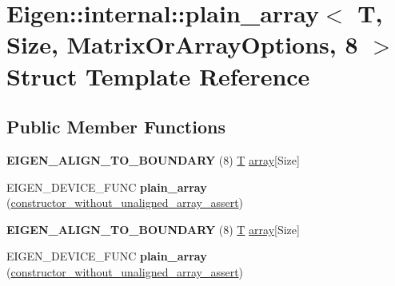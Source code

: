 \hypertarget{struct_eigen_1_1internal_1_1plain__array_3_01_t_00_01_size_00_01_matrix_or_array_options_00_018_01_4}{}\section{Eigen\+:\+:internal\+:\+:plain\+\_\+array$<$ T, Size, Matrix\+Or\+Array\+Options, 8 $>$ Struct Template Reference}
\label{struct_eigen_1_1internal_1_1plain__array_3_01_t_00_01_size_00_01_matrix_or_array_options_00_018_01_4}
\subsection*{Public Member Functions}
\begin{DoxyCompactItemize}
\item 
\mbox{\label{struct_eigen_1_1internal_1_1plain__array_3_01_t_00_01_size_00_01_matrix_or_array_options_00_018_01_4_abd9f738535f730c17f744f00c0bc7db1}} 
{\bfseries E\+I\+G\+E\+N\+\_\+\+A\+L\+I\+G\+N\+\_\+\+T\+O\+\_\+\+B\+O\+U\+N\+D\+A\+RY} (8) \hyperlink{group___sparse_core___module}{T} \hyperlink{class_eigen_1_1array}{array}\mbox{[}Size\mbox{]}
\item 
\mbox{\label{struct_eigen_1_1internal_1_1plain__array_3_01_t_00_01_size_00_01_matrix_or_array_options_00_018_01_4_a857fc25d08c572951cda04c51f5343d3}} 
E\+I\+G\+E\+N\+\_\+\+D\+E\+V\+I\+C\+E\+\_\+\+F\+U\+NC {\bfseries plain\+\_\+array} (\hyperlink{struct_eigen_1_1internal_1_1constructor__without__unaligned__array__assert}{constructor\+\_\+without\+\_\+unaligned\+\_\+array\+\_\+assert})
\item 
\mbox{\label{struct_eigen_1_1internal_1_1plain__array_3_01_t_00_01_size_00_01_matrix_or_array_options_00_018_01_4_abd9f738535f730c17f744f00c0bc7db1}} 
{\bfseries E\+I\+G\+E\+N\+\_\+\+A\+L\+I\+G\+N\+\_\+\+T\+O\+\_\+\+B\+O\+U\+N\+D\+A\+RY} (8) \hyperlink{group___sparse_core___module}{T} \hyperlink{class_eigen_1_1array}{array}\mbox{[}Size\mbox{]}
\item 
\mbox{\label{struct_eigen_1_1internal_1_1plain__array_3_01_t_00_01_size_00_01_matrix_or_array_options_00_018_01_4_a857fc25d08c572951cda04c51f5343d3}} 
E\+I\+G\+E\+N\+\_\+\+D\+E\+V\+I\+C\+E\+\_\+\+F\+U\+NC {\bfseries plain\+\_\+array} (\hyperlink{struct_eigen_1_1internal_1_1constructor__without__unaligned__array__assert}{constructor\+\_\+without\+\_\+unaligned\+\_\+array\+\_\+assert})
\end{DoxyCompactItemize}


